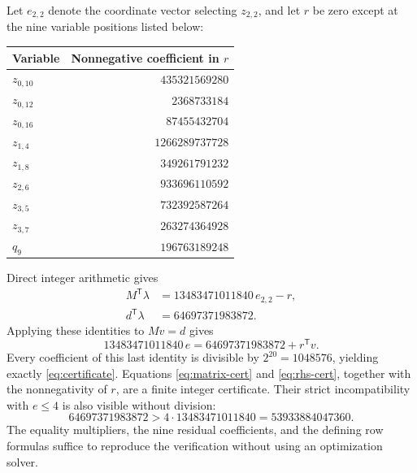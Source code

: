 \documentclass[11pt]{article}
\theoremstyle{remark}
\begin{document}
Let $e_{2,2}$ denote the coordinate vector selecting $z_{2,2}$, and let
$r$ be zero except at the nine variable positions listed below:
\begin{center}
\begin{tabular}{lr}
\toprule
Variable&Nonnegative coefficient in $r$\\
\midrule
$z_{0,10}$&$435321569280$\\
$z_{0,12}$&$2368733184$\\
$z_{0,16}$&$87455432704$\\
$z_{1,4}$&$1266289737728$\\
$z_{1,8}$&$349261791232$\\
$z_{2,6}$&$933696110592$\\
$z_{3,5}$&$732392587264$\\
$z_{3,7}$&$263274364928$\\
$q_9$&$196763189248$\\
\bottomrule
\end{tabular}
\end{center}
Direct integer arithmetic gives
\begin{align}
 M^{\mathsf T}\lambda
   &=13483471011840\,e_{2,2}-r,
 \label{eq:matrix-cert}\\
 d^{\mathsf T}\lambda&=64697371983872.
 \label{eq:rhs-cert}
\end{align}
Applying these identities to $Mv=d$ gives
\[
 13483471011840\,e=64697371983872+r^{\mathsf T}v.
\]
Every coefficient of this last identity is divisible by $2^{20}=1048576$,
yielding exactly \eqref{eq:certificate}.  Equations
\eqref{eq:matrix-cert} and \eqref{eq:rhs-cert}, together with
the nonnegativity of $r$, are a finite integer certificate.
Their strict incompatibility with $e\leq4$ is also visible without
division:
\[
 64697371983872>4\cdot13483471011840=53933884047360.
\]
The equality multipliers, the nine residual coefficients, and the
defining row formulas suffice to reproduce the verification without
using an optimization solver.
\end{document}
